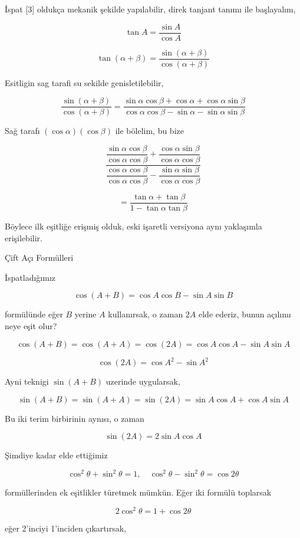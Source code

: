 \documentclass[12pt,fleqn]{article}\usepackage{../../common}
\begin{document}
İspat [3] oldukça mekanik şekilde yapılabilir, direk tanjant tanımı ile başlayalım,

$$
\tan A = \frac{\sin A}{\cos A}
$$

$$
\tan (\alpha + \beta) = \frac{\sin (\alpha + \beta)}{\cos (\alpha + \beta)}
$$

Esitligin sag tarafi su sekilde genisletilebilir,

$$
\frac{\sin (\alpha + \beta)}{\cos (\alpha + \beta)} =
\frac{\sin\alpha \cos\beta + \cos\alpha + \cos\alpha \sin\beta }
     {\cos\alpha \cos\beta - \sin\alpha - \sin\alpha \sin\beta}
$$

Sağ tarafı $(\cos\alpha)(\cos\beta)$ ile bölelim, bu bize 

$$
\dfrac{\dfrac{\sin\alpha\cos\beta}{\cos\alpha\cos\beta} + \dfrac{\cos\alpha\sin\beta}{\cos\alpha\cos\beta}}
      {\dfrac{\cos\alpha\cos\beta}{\cos\alpha\cos\beta} - \dfrac{\sin\alpha\sin\beta}{\cos\alpha\cos\beta}}
$$

$$
= \frac{\tan\alpha + \tan\beta}{1 - \tan\alpha \tan\beta}
$$

Böylece ilk eşitliğe erişmiş olduk, eski işaretli versiyona aynı yaklaşımla erişilebilir.

Çift Açı Formülleri

İspatladığımız

$$
\cos(A+B) = \cos A \cos B - \sin A \sin B
$$

formülünde eğer $B$ yerine $A$ kullanırsak, o zaman $2A$ elde ederiz, bunun
açılımı neye eşit olur?

$$
\cos(A+B) = \cos(A+A) = \cos(2A) = \cos A \cos A - \sin A \sin A
$$

$$
\cos(2A) = \cos A^2 - \sin A^2
$$

Ayni teknigi $\sin(A+B)$ uzerinde uygularsak,

$$
\sin(A+B) = \sin(A+A) = \sin(2A) =
\sin A \cos A + \cos A \sin A
$$

Bu iki terim birbirinin aynısı, o zaman

$$
\sin(2A) = 2\sin A \cos A
$$

Şimdiye kadar elde ettiğimiz

$$
\cos^2\theta + \sin^2\theta = 1, \quad
\cos^2\theta - \sin^2\theta = \cos2\theta
$$

formüllerinden ek eşitlikler türetmek mümkün. Eğer iki formülü toplarsak

$$
2\cos^2\theta = 1 + \cos2\theta 
$$

eğer 2'inciyi 1'inciden çıkartırsak,
\end{document}
